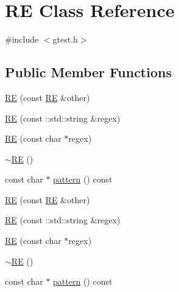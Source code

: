 \hypertarget{classtesting_1_1internal_1_1RE}{\section{\-R\-E \-Class \-Reference}
\label{d0/d6d/classtesting_1_1internal_1_1RE}
}


{\ttfamily \#include $<$gtest.\-h$>$}

\subsection*{\-Public \-Member \-Functions}
\begin{DoxyCompactItemize}
\item 
\hyperlink{classtesting_1_1internal_1_1RE_a595721ca271f97f926b0024ee36f4305}{\-R\-E} (const \hyperlink{classtesting_1_1internal_1_1RE}{\-R\-E} \&other)
\item 
\hyperlink{classtesting_1_1internal_1_1RE_a404b822f17c61852e6ee051d640bc91a}{\-R\-E} (const \-::std\-::string \&regex)
\item 
\hyperlink{classtesting_1_1internal_1_1RE_acafbef7f6d73940eaaea218096401882}{\-R\-E} (const char $\ast$regex)
\item 
\hyperlink{classtesting_1_1internal_1_1RE_a5ecc9d1b82500bffed737dfbcd0b0c60}{$\sim$\-R\-E} ()
\item 
const char $\ast$ \hyperlink{classtesting_1_1internal_1_1RE_a78c2af4526e681809368a114f24c53e4}{pattern} () const 
\item 
\hyperlink{classtesting_1_1internal_1_1RE_a595721ca271f97f926b0024ee36f4305}{\-R\-E} (const \hyperlink{classtesting_1_1internal_1_1RE}{\-R\-E} \&other)
\item 
\hyperlink{classtesting_1_1internal_1_1RE_a404b822f17c61852e6ee051d640bc91a}{\-R\-E} (const \-::std\-::string \&regex)
\item 
\hyperlink{classtesting_1_1internal_1_1RE_acafbef7f6d73940eaaea218096401882}{\-R\-E} (const char $\ast$regex)
\item 
\hyperlink{classtesting_1_1internal_1_1RE_a5ecc9d1b82500bffed737dfbcd0b0c60}{$\sim$\-R\-E} ()
\item 
const char $\ast$ \hyperlink{classtesting_1_1internal_1_1RE_a78c2af4526e681809368a114f24c53e4}{pattern} () const 
\end{DoxyCompactItemize}
